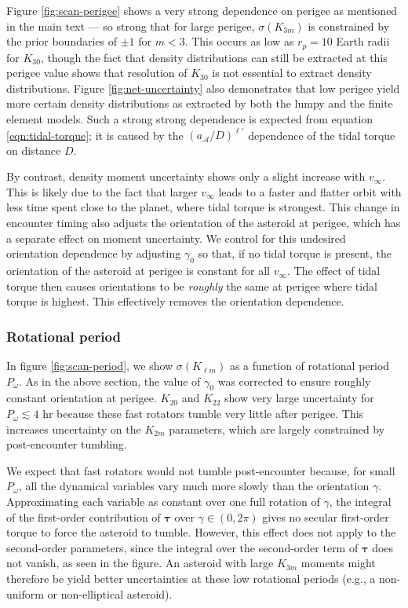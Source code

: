\documentclass[fleqn,usenatbib]{mnras}
\begin{document}
Figure \ref{fig:scan-perigee} shows a very strong dependence on perigee as mentioned in the main text --- so strong that for large perigee, $\sigma(K_{3m})$ is constrained by the prior boundaries of $\pm 1$ for $m < 3$. This occurs as low as $r_p = 10$ Earth radii for $K_{30}$, though the fact that density distributions can still be extracted at this perigee value shows that resolution of $K_{30}$ is not essential to extract density distributions. Figure \ref{fig:net-uncertainty} also demonstrates that low perigee yield more certain density distributions as extracted by both the lumpy and the finite element models. Such a strong strong dependence is expected from equation \ref{eqn:tidal-torque}; it is caused by the $(a_\mathcal{A}/D)^{\ell'}$ dependence of the tidal torque on distance $D$.

By contrast, density moment uncertainty shows only a slight increase with $v_\infty$. This is likely due to the fact that larger $v_\infty$ leads to a faster and flatter orbit with less time spent close to the planet, where tidal torque is strongest. This change in encounter timing also adjusts the orientation of the asteroid at perigee, which has a separate effect on moment uncertainty. We control for this undesired orientation dependence by adjusting $\gamma_0$ so that, if no tidal torque is present, the orientation of the asteroid at perigee is constant for all $v_\infty$. The effect of tidal torque then causes orientations to be \textit{roughly} the same at perigee where tidal torque is highest. This effectively removes the orientation dependence.

\subsubsection{Rotational period}
\label{sec:scan-period}

In figure \ref{fig:scan-period}, we show $\sigma(K_{\ell m})$ as a function of rotational period $P_\omega$. As in the above section, the value of $\gamma_0$ was corrected to ensure roughly constant orientation at perigee. $K_{20}$ and $K_{22}$ show very large uncertainty for $P_\omega \lesssim 4$ hr because these fast rotators tumble very little after perigee. This increases uncertainty on the $K_{2m}$ parameters, which are largely constrained by post-encounter tumbling.

We expect that fast rotators would not tumble post-encounter because, for small $P_\omega$, all the dynamical variables vary much more slowly than the orientation $\gamma$. Approximating each variable as constant over one full rotation of $\gamma$, the integral of the first-order contribution of $\bm \tau$ over $\gamma \in (0, 2\pi)$ gives no secular first-order torque to force the asteroid to tumble. However, this effect does not apply to the second-order parameters, since the integral over the second-order term of $\bm \tau$ does not vanish, as seen in the figure. An asteroid with large $K_{3m}$ moments might therefore be yield better uncertainties at these low rotational periods (e.g., a non-uniform or non-elliptical asteroid).
\end{document}
